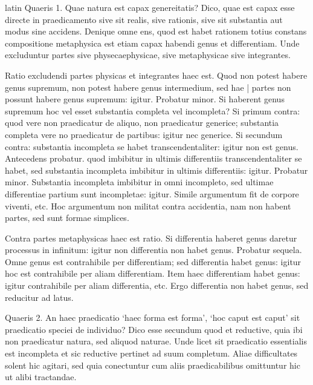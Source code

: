 \begin{otherlanguage*}{latin}
\pstart
 Quaeris 1. Quae natura est capax genereitatis? Dico, quae est capax esse directe in praedicamento sive sit realis, sive rationis, sive sit substantia aut modus sine accidens. Denique omne ens, quod est habet rationem totius constans compositione metaphysica est etiam capax habendi genus et differentiam. Unde excluduntur partes sive physecaephysicae, sive metaphysicae sive integrantes. 
\pend

\pstart
 Ratio excludendi partes physicas et integrantes haec est. Quod non potest habere genus supremum, non potest habere genus intermedium, sed hae \textnormal{|} partes non possunt habere genus supremum: igitur. Probatur minor. Si haberent genus supremum hoc vel esset substantia completa vel incompleta? Si primum contra: quod vere non praedicatur de aliquo, non praedicatur generice; substantia completa vere no praedicatur de partibus: igitur nec generice. Si secundum contra: substantia incompleta se habet transcendentaliter: igitur non est genus. Antecedens probatur. quod imbibitur in ultimis differentiis transcendentaliter se habet, sed substantia incompleta imbibitur in ultimis differentiis: igitur. Probatur minor. Substantia incompleta imbibitur in omni incompleto, sed ultimae differentiae partium sunt incompletae: igitur. Simile argumentum fit de corpore viventi, etc. Hoc argumentum non militat contra accidentia, nam non habent partes, sed sunt formae simplices. 
\pend

\pstart
 Contra partes metaphysicas haec est ratio. Si differentia haberet genus daretur processus in infinitum: igitur non differentia non habet genus. Probatur sequela. Omne genus est contrahibile per differentiam; sed differentia habet genus: igitur hoc est contrahibile per aliam differentiam. Item haec differentiam habet genus: igitur contrahibile per aliam differentia, etc. Ergo differentia non habet genus, sed reducitur ad latus. 
\pend

\pstart
 Quaeris 2. An haec praedicatio `haec forma est forma', `hoc caput est caput' sit praedicatio speciei de individuo? Dico esse secundum quod et reductive, quia ibi non praedicatur natura, sed aliquod naturae. Unde licet sit praedicatio essentialis est incompleta et sic reductive pertinet ad suum completum. Aliae difficultates solent hic agitari, sed quia conectuntur cum aliis praedicabilibus omittuntur hic ut alibi tractandae. 
\pend

        \pstart
        \pend
      

\end{otherlanguage*}
